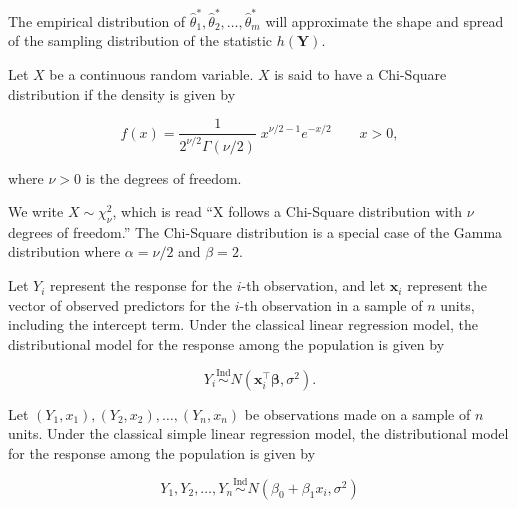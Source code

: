 \documentclass[
  letterpaper,
  DIV=11,
  numbers=noendperiod]{scrreprt}
\providecommand{\tightlist}{%
  \setlength{\itemsep}{0pt}\setlength{\parskip}{0pt}}\usepackage{longtable,booktabs,array}
\theoremstyle{definition}
\theoremstyle{plain}
\theoremstyle{definition}
\theoremstyle{remark}
\begin{document}
The empirical distribution of
\(\widehat{\theta}_1^*, \widehat{\theta}_2^*, \dotsc, \widehat{\theta}_m^*\)
will approximate the shape and spread of the sampling distribution of
the statistic \(h(\mathbf{Y})\).

\begin{description}
\tightlist
\item[Chi-Square Distribution
(Definition~\ref{def-chi-square-distribution})]
Let \(X\) be a continuous random variable. \(X\) is said to have a
Chi-Square distribution if the density is given by
\end{description}

\[f(x) = \frac{1}{2^{\nu/2}\Gamma (\nu/2)}\;x^{\nu/2-1}e^{-x/2} \qquad x > 0,\]

where \(\nu > 0\) is the degrees of freedom.

We write \(X \sim \chi^2_{\nu}\), which is read ``X follows a Chi-Square
distribution with \(\nu\) degrees of freedom.'' The Chi-Square
distribution is a special case of the Gamma distribution where
\(\alpha = \nu/2\) and \(\beta = 2\).

\begin{description}
\tightlist
\item[Classical Regression Model (Definition~\ref{def-multiple-model})]
Let \(Y_i\) represent the response for the \(i\)-th observation, and let
\(\mathbf{x}_i\) represent the vector of observed predictors for the
\(i\)-th observation in a sample of \(n\) units, including the intercept
term. Under the classical linear regression model, the distributional
model for the response among the population is given by
\end{description}

\[Y_i \stackrel{\text{Ind}}{\sim} N\left(\mathbf{x}_i^\top \boldsymbol{\beta}, \sigma^2\right).\]

\begin{description}
\tightlist
\item[Classical Simple Linear Regression
(Definition~\ref{def-classical-simple-regression})]
Let
\(\left(Y_1, x_1\right), \left(Y_2, x_2\right), \dotsc, \left(Y_n, x_n\right)\)
be observations made on a sample of \(n\) units. Under the classical
simple linear regression model, the distributional model for the
response among the population is given by
\end{description}

\[Y_1, Y_2, \dotsc, Y_n \stackrel{\text{Ind}}{\sim} N\left(\beta_0 + \beta_1 x_i, \sigma^2\right)\]
\end{document}
